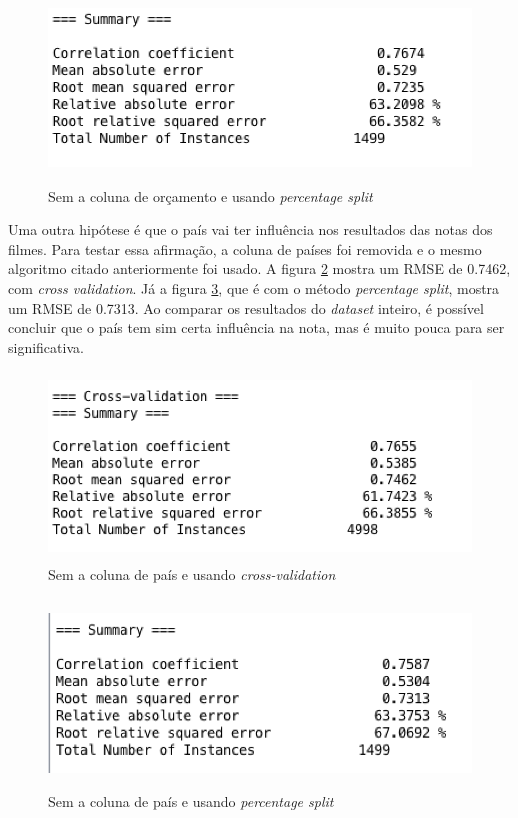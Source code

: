 \begin{figure}[H]
\centering
\includegraphics[height=5cm]{imagens/no_budget_split.png}
\caption{Sem a coluna de orçamento e usando \textit{percentage split}}
\label{nobudgetsplit}
\end{figure}


Uma outra hipótese é que o país vai ter influência nos resultados das notas dos filmes. Para testar essa afirmação, a coluna de países foi removida e o mesmo algoritmo citado anteriormente foi usado. A figura \ref{nocountrycv} mostra um RMSE de 0.7462, com \textit{cross validation}. Já a figura \ref{nocountrysplit}, que é com o método \textit{percentage split}, mostra um RMSE de 0.7313. Ao comparar os resultados do \textit{dataset} inteiro, é possível concluir que o país tem sim certa influência na nota, mas é muito pouca para ser significativa. 

\begin{figure}[H]
\centering
\includegraphics[height=5cm]{imagens/no_country_cv.png}
\caption{Sem a coluna de país e usando \textit{cross-validation}}
\label{nocountrycv}
\end{figure}

\begin{figure}[H]
\centering
\includegraphics[height=5cm]{imagens/no_country_split.png}
\caption{Sem a coluna de país e usando \textit{percentage split}}
\label{nocountrysplit}
\end{figure}


